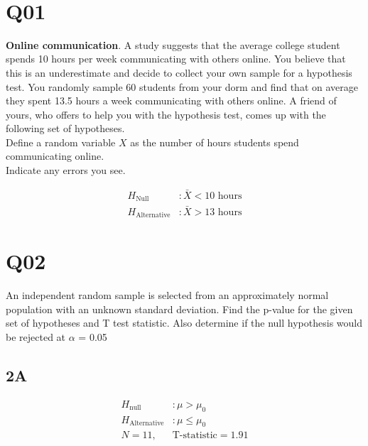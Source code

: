 \documentclass[11pt]{article}
\begin{document}
\ \\


\section*{Q01}


\textbf{Online communication}. A study suggests that the average college student spends 10 hours per week communicating with others online. You believe that this is an underestimate and decide to collect your own sample for a hypothesis test. You randomly sample 60 students from your dorm and find that on average they spent 13.5 hours a week communicating with others online. A friend of yours, who offers to help you with the hypothesis test, comes up with the following set of hypotheses.\\

Define a random variable $X$ as the number of hours students spend communicating online.\\

Indicate any errors you see.

\begin{align*}
  H_{\text{Null}} &: \bar{X} < 10 \text{ hours}\\
  H_{\text{Alternative}} &: \bar{X} > 13 \text{ hours}
\end{align*}

\clearpage



\section*{Q02}

An independent random sample is selected from an approximately
normal population with an unknown standard deviation. Find the p-value for the given set of hypotheses and T test statistic.
Also determine if the null hypothesis would be rejected at $\alpha$ = 0.05

\subsection*{2A}

\begin{align*}
  H_{\text{null}}&: \mu > \mu_{0}\\
  H_{\text{Alternative}}&: \mu \le \mu_{0}\\
  N = 11, \;  & \text{T-statistic} = 1.91
\end{align*}
\end{document}
